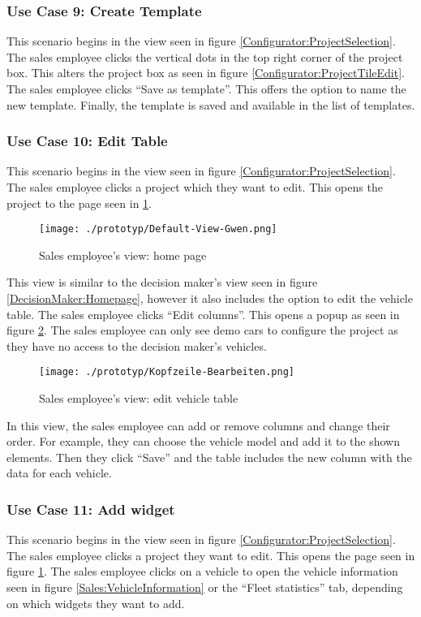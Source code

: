 \subsubsection{Use Case 9: Create Template}
This scenario begins in the view seen in figure \ref{Configurator:ProjectSelection}. The sales employee clicks the vertical dots in the top right corner of the project box. This alters the project box as seen in figure \ref{Configurator:ProjectTileEdit}. The sales employee clicks \enquote{Save as template}. This offers the option to name the new template. Finally, the template is saved and available in the list of templates.


\subsubsection{Use Case 10: Edit Table}

This scenario begins in the view seen in figure \ref{Configurator:ProjectSelection}. The sales employee clicks a project which they want to edit. This opens the project to the page seen in \ref{Sales:VehicleList}. 

\begin{figure}[H]
  \centering
  \texttt{[image: ./prototyp/Default-View-Gwen.png]}
  \caption{Sales employee's view: home page}
  \label{Sales:VehicleList}
\end{figure}

This view is similar to the decision maker's view seen in figure \ref{DecisionMaker:Homepage}, however it also includes the option to edit the vehicle table. The sales employee clicks \enquote{Edit columns}. This opens a popup as seen in figure \ref{Sales:EditTable}. The sales employee can only see demo cars to configure the project as they have no access to the decision maker's vehicles.

\begin{figure}[ht]
  \centering
  \texttt{[image: ./prototyp/Kopfzeile-Bearbeiten.png]}
  \caption{Sales employee's view: edit vehicle table}
  \label{Sales:EditTable}
\end{figure}

In this view, the sales employee can add or remove columns and change their order. For example, they can choose the vehicle model and add it to the shown elements. Then they click \enquote{Save} and the table includes the new column with the data for each vehicle.


\subsubsection{Use Case 11: Add \Gls{widget}}
This scenario begins in the view seen in figure \ref{Configurator:ProjectSelection}. The sales employee clicks a project they want to edit. This opens the page seen in figure \ref{Sales:VehicleList}. The sales employee clicks on a vehicle to open the vehicle information seen in figure \ref{Sales:VehicleInformation} or the \enquote{Fleet statistics} tab, depending on which \glspl{widget} they want to add.

